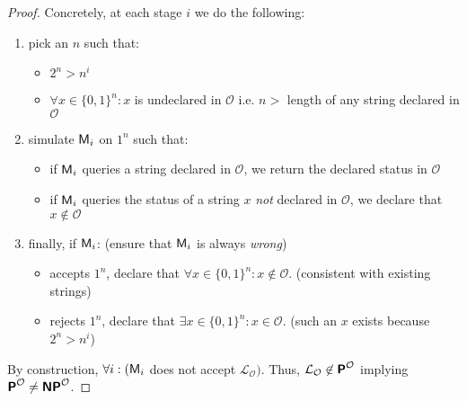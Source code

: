 \documentclass[usletter]{article}
\newcommand{\collection}[1]
           {\ensuremath{\mathcal{#1}}}
\newcommand{\machine}[1]
           {\ensuremath{\textnormal{\textsf{#1}}}}
\newcommand{\family}[1]
           {\ensuremath{\textnormal{\textsf{\textbf{#1}}}}}
\begin{document}
\begin{proof}
\noindent
Concretely, at each stage $i$ we do the following:
\begin{enumerate}
  \item pick an $n$ such that:
  \begin{itemize}
    \item $2^n > n^i$
    \item $\forall x \in \{0, 1\}^n : x$ is undeclared in \collection{O} i.e. $n >$ length of any string declared in \collection{O}
  \end{itemize}
  \item simulate $\machine{M}_i$ on $1^n$ such that:
  \begin{itemize}
    \item if $\machine{M}_i$ queries a string declared in \collection{O}, we return the declared status in \collection{O}
    \item if $\machine{M}_i$ queries the status of a string $x$ \textit{not} declared in \collection{O}, we declare that $x \not\in \collection{O}$
  \end{itemize}
  \item finally, if $\machine{M}_i$: \hfill (ensure that $\machine{M}_i$ is always \textit{wrong})
  \begin{itemize}
    \item accepts $1^n$, declare that $\forall x \in \{0,1\}^n : x \not\in \collection{O}$. \hfill (consistent with existing strings)
    \item rejects $1^n$, declare that $\exists x \in \{0,1\}^n : x \in \collection{O}$. \hfill (such an $x$ exists because $2^n > n^i$)
  \end{itemize}
\end{enumerate}
By construction, $\forall i : (\machine{M}_i$ does not accept $\collection{L}_\collection{O})$. Thus, $\collection{L}_\collection{O} \not\in \family{P}^\collection{O}$ implying $\family{P}^\collection{O} \neq \family{NP}^\collection{O}$.
\end{proof}



\end{document}
